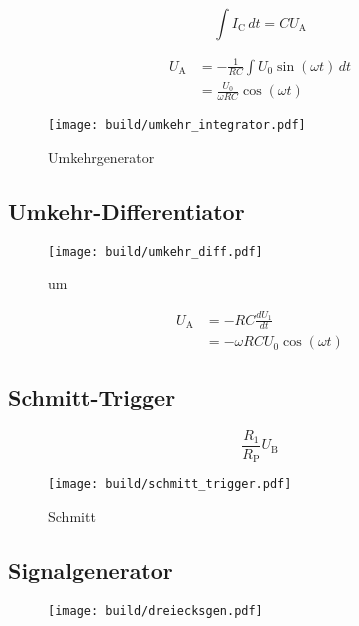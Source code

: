 \begin{equation}
		\int I_\text{C} \, dt = C U_\text{A}
\end{equation}

\begin{align}
		U_\text{A} &= - \frac{1}{RC} \int U_\text{0} \sin(\omega t) \, dt \\
				   &= \frac{U_0}{\omega R C} \cos (\omega t)
\end{align}

\begin{figure}[h]
		\centering
		\texttt{[image: build/umkehr\_integrator.pdf]}
		\caption{Umkehrgenerator}
		\label{fig:name}
\end{figure}

\subsection{Umkehr-Differentiator}%
\label{sub:umkehr_differentiator}

\begin{figure}[h]
		\centering
		\texttt{[image: build/umkehr\_diff.pdf]}
		\caption{um}
		\label{fig:}
\end{figure}

\begin{align}
		U_\text{A} &= - RC \frac{dU_1}{dt} \\
				   &= - \omega R C U_0 \cos(\omega t)
\end{align}

\subsection{Schmitt-Trigger}%
\label{sub:schmitt_trigger}

\begin{equation}
		\label{eq:schmitt}
		\frac{R_1}{R_\text{P}} U_\text{B}
\end{equation}

\begin{figure}[h]
		\centering
		\texttt{[image: build/schmitt\_trigger.pdf]}
		\caption{Schmitt}
		\label{fig:}
\end{figure}

\subsection{Signalgenerator}%
\label{sub:signalgenerator}

\begin{figure}[h]
		\centering
		\texttt{[image: build/dreiecksgen.pdf]}
		\caption{}
		\label{fig:}
\end{figure}

